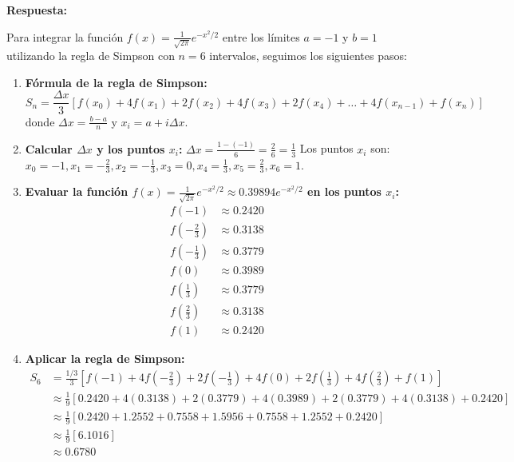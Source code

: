\documentclass[12pt]{article}
\begin{document}
\textbf{Respuesta:}

Para integrar la función $f(x) = \frac{1}{\sqrt{2\pi}} e^{-x^2/2}$ entre los límites $a = -1$ y $b = 1$ utilizando la regla de Simpson con $n = 6$ intervalos, seguimos los siguientes pasos:

\begin{enumerate}
    \item \textbf{Fórmula de la regla de Simpson:}
    $$S_n = \frac{\Delta x}{3} \left[ f(x_0) + 4f(x_1) + 2f(x_2) + 4f(x_3) + 2f(x_4) + \dots + 4f(x_{n-1}) + f(x_n) \right]$$
    donde $\Delta x = \frac{b - a}{n}$ y $x_i = a + i\Delta x$.

    \item \textbf{Calcular $\Delta x$ y los puntos $x_i$:}
    $\Delta x = \frac{1 - (-1)}{6} = \frac{2}{6} = \frac{1}{3}$
    Los puntos $x_i$ son: $x_0 = -1, x_1 = -\frac{2}{3}, x_2 = -\frac{1}{3}, x_3 = 0, x_4 = \frac{1}{3}, x_5 = \frac{2}{3}, x_6 = 1$.

    \item \textbf{Evaluar la función $f(x) = \frac{1}{\sqrt{2\pi}} e^{-x^2/2} \approx 0.39894 e^{-x^2/2}$ en los puntos $x_i$:}
    \begin{align*}
        f(-1) &\approx 0.2420 \\
        f(-\frac{2}{3}) &\approx 0.3138 \\
        f(-\frac{1}{3}) &\approx 0.3779 \\
        f(0) &\approx 0.3989 \\
        f(\frac{1}{3}) &\approx 0.3779 \\
        f(\frac{2}{3}) &\approx 0.3138 \\
        f(1) &\approx 0.2420
    \end{align*}

    \item \textbf{Aplicar la regla de Simpson:}
    \begin{align*}
        S_6 &= \frac{1/3}{3} \left[ f(-1) + 4f(-\frac{2}{3}) + 2f(-\frac{1}{3}) + 4f(0) + 2f(\frac{1}{3}) + 4f(\frac{2}{3}) + f(1) \right] \\
        &\approx \frac{1}{9} \left[ 0.2420 + 4(0.3138) + 2(0.3779) + 4(0.3989) + 2(0.3779) + 4(0.3138) + 0.2420 \right] \\
        &\approx \frac{1}{9} \left[ 0.2420 + 1.2552 + 0.7558 + 1.5956 + 0.7558 + 1.2552 + 0.2420 \right] \\
        &\approx \frac{1}{9} [6.1016] \\
        &\approx 0.6780
    \end{align*}
\end{enumerate}
\end{document}
